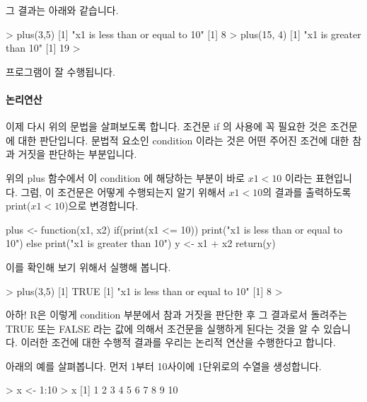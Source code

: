 그 결과는 아래와 같습니다. 

\begin{Schunk}
\begin{Soutput}
> plus(3,5)
[1] "x1 is less than or equal to 10"
[1] 8
> plus(15, 4)
[1] "x1 is greater than 10"
[1] 19
> 
\end{Soutput}
\end{Schunk}

프로그램이 잘 수행됩니다. 

\paragraph{논리연산}
이제 다시 위의 문법을 살펴보도록 합니다. 
조건문 if 의 사용에 꼭 필요한 것은 조건문에 대한 판단입니다.
문법적 요소인  condition 이라는 것은 어떤 주어진 조건에 대한 참과 거짓을 판단하는 부분입니다.

위의 plus 함수에서 이 condition 에 해당하는 부분이 바로 $x1 < 10$ 이라는 표현입니다. 
그럼, 이 조건문은 어떻게 수행되는지 알기 위해서 $x1 < 10$의 결과를 출력하도록 print($x1<10$)으로 변경합니다.
 
\begin{Schunk}
\begin{Soutput}
plus <- function(x1, x2){
	if(print(x1 <= 10)) print("x1 is less than or equal to 10")
	else print("x1 is greater than 10")
	y <- x1 + x2
	return(y)
}
\end{Soutput}
\end{Schunk}

이를 확인해 보기 위해서 실행해 봅니다. 
\begin{Schunk}
\begin{Soutput}
> plus(3,5)
[1] TRUE
[1] "x1 is less than or equal to 10"
[1] 8
> 
\end{Soutput}
\end{Schunk}

아하! R은 이렇게 condition 부분에서 참과 거짓을 판단한 후 그 결과로서 돌려주는 TRUE 또는 FALSE 라는 값에 의해서 조건문을 실행하게 된다는 것을 알 수 있습니다. 
이러한 조건에 대한 수행적 결과를 우리는 논리적 연산을 수행한다고 합니다. 

아래의 예를 살펴봅니다.
먼저 1부터 10사이에 1단위로의 수열을 생성합니다.

\begin{Schunk}
\begin{Soutput}
> x <- 1:10
> x
 [1]  1  2  3  4  5  6  7  8  9 10
\end{Soutput}
\end{Schunk}

